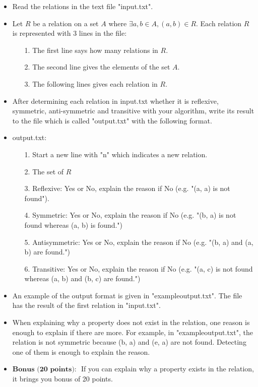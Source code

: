 \documentclass[a4 paper]{article}
\numberwithin{equation}{section}
\newcommand{\0}{\mathbf{0}}
\begin{document}
\begin{itemize}
	\item Read the relations in the text file "input.txt".
	\item Let $R$ be a relation on a set $A$ where $\exists a,b \in A, (a,b) \in R$. Each relation $R$ is represented with 3 lines in the file:
	\begin{itemize}
		\item [1.] The first line says how many relations in $R$.
		\item[2.] The second line gives the elements of the set $A$.
		\item[3.] The following lines gives each relation in $R$.
	\end{itemize}
	\item After determining each relation in input.txt whether it is reflexive, symmetric, anti-symmetric and transitive with your algorithm, write its result to the file which is called "output.txt" with the following format.
	\item output.txt:
	\begin{itemize}
		\item[1.] Start a new line with "n" which indicates a new relation.
		\item[2.] The set of $R$
		\item[3.] Reflexive: Yes or No, explain the reason if No (e.g. "(a, a) is not found").
		\item[4.] Symmetric: Yes or No, explain the reason if No (e.g. "(b, a) is not found whereas (a, b) is found.")
		\item[5.] Antisymmetric: Yes or No, explain the reason if No (e.g. "(b, a) and (a, b) are found.")
		\item[6.] Transitive: Yes or No, explain the reason if No (e.g. "(a, c) is not found whereas (a, b) and (b, c) are found.")
	\end{itemize}
	\item An example of the output format is given in "exampleoutput.txt". The file has the result of the first relation in "input.txt".
	\item When explaining why a property does not exist in the relation, one reason is enough to explain if there are more. For example, in "exampleoutput.txt", the relation is not symmetric because (b, a) and (e, a) are not found. Detecting one of them is enough to explain the reason.
	\item $\textbf{Bonus (20 points): }$ If you can explain why a property exists in the relation, it brings you bonus of 20 points.

\end{itemize}
\end{document}
